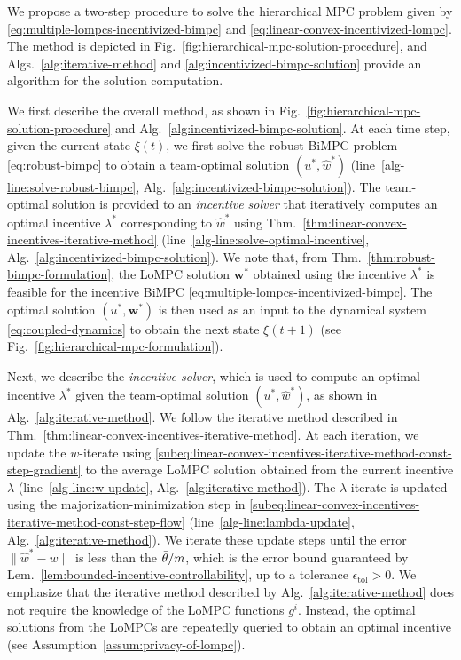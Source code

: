 We propose a two-step procedure to solve the hierarchical MPC problem given by \eqref{eq:multiple-lompcs-incentivized-bimpc} and \eqref{eq:linear-convex-incentivized-lompc}.
The method is depicted in Fig.~\ref{fig:hierarchical-mpc-solution-procedure}, and Algs.~\ref{alg:iterative-method} and \ref{alg:incentivized-bimpc-solution} provide an algorithm for the solution computation.

We first describe the overall method, as shown in Fig.~\ref{fig:hierarchical-mpc-solution-procedure} and Alg.~\ref{alg:incentivized-bimpc-solution}.
At each time step, given the current state $\xi(t)$, we first solve the robust BiMPC problem \eqref{eq:robust-bimpc} to obtain a team-optimal solution $(u^*, \hat{w}^*)$ (line~\ref{alg-line:solve-robust-bimpc}, Alg.~\ref{alg:incentivized-bimpc-solution}).
The team-optimal solution is provided to an \emph{incentive solver} that iteratively computes an optimal incentive $\lambda^*$ corresponding to $\hat{w}^*$ using Thm.~\ref{thm:linear-convex-incentives-iterative-method} (line~\ref{alg-line:solve-optimal-incentive}, Alg.~\ref{alg:incentivized-bimpc-solution}).
We note that, from Thm.~\ref{thm:robust-bimpc-formulation}, the LoMPC solution $\bm{w}^*$ obtained using the incentive $\lambda^*$ is feasible for the incentive BiMPC \eqref{eq:multiple-lompcs-incentivized-bimpc}.
The optimal solution $(u^*, \bm{w}^*)$ is then used as an input to the dynamical system \eqref{eq:coupled-dynamics} to obtain the next state $\xi(t+1)$ (see Fig.~\ref{fig:hierarchical-mpc-formulation}).

Next, we describe the \emph{incentive solver}, which is used to compute an optimal incentive $\lambda^*$ given the team-optimal solution $(u^*, \hat{w}^*)$, as shown in Alg.~\ref{alg:iterative-method}.
We follow the iterative method described in Thm.~\ref{thm:linear-convex-incentives-iterative-method}.
At each iteration, we update the $w$-iterate using \eqref{subeq:linear-convex-incentives-iterative-method-const-step-gradient} to the average LoMPC solution obtained from the current incentive $\lambda$ (line~\ref{alg-line:w-update}, Alg.~\ref{alg:iterative-method}).
The $\lambda$-iterate is updated using the majorization-minimization step in \eqref{subeq:linear-convex-incentives-iterative-method-const-step-flow} (line~\ref{alg-line:lambda-update}, Alg.~\ref{alg:iterative-method}).
We iterate these update steps until the error $\lVert \hat{w}^* - w\rVert$ is less than the $\bar{\theta}/m$, which is the error bound guaranteed by Lem.~\ref{lem:bounded-incentive-controllability}, up to a tolerance $\epsilon_\text{tol} > 0$.
We emphasize that the iterative method described by Alg.~\ref{alg:iterative-method} does not require the knowledge of the LoMPC functions $g^i$.
Instead, the optimal solutions from the LoMPCs are repeatedly queried to obtain an optimal incentive (see Assumption~\ref{assum:privacy-of-lompc}).


